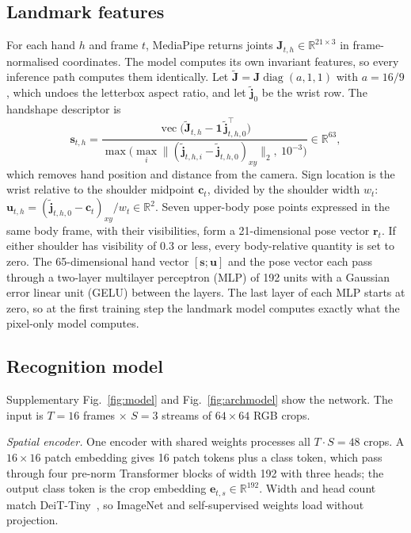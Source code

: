 \documentclass[pdflatex,sn-mathphys-num,twocolumn,lineno]{sn-jnl}
\theoremstyle{thmstyleone}%
\begin{document}
\subsection{Landmark features}\label{sec:method:lm}
For each hand $h$ and frame $t$, MediaPipe returns joints $\mathbf{J}_{t,h}\in\mathbb{R}^{21\times3}$ in frame-normalised coordinates. The model computes its own invariant features, so every inference path computes them identically. Let $\tilde{\mathbf{J}}=\mathbf{J}\operatorname{diag}(a,1,1)$ with $a=16/9$, which undoes the letterbox aspect ratio, and let $\tilde{\mathbf{j}}_{0}$ be the wrist row. The handshape descriptor is
\begin{equation}
\mathbf{s}_{t,h}=\frac{\operatorname{vec}\big(\tilde{\mathbf{J}}_{t,h}-\mathbf{1}\,\tilde{\mathbf{j}}^{\top}_{t,h,0}\big)}{\max\!\big(\max_i\lVert(\tilde{\mathbf{j}}_{t,h,i}-\tilde{\mathbf{j}}_{t,h,0})_{xy}\rVert_2,\ 10^{-3}\big)}\in\mathbb{R}^{63},\label{eq:shape}
\end{equation}
which removes hand position and distance from the camera. Sign location is the wrist relative to the shoulder midpoint $\mathbf{c}_t$, divided by the shoulder width $w_t$: $\mathbf{u}_{t,h}=(\tilde{\mathbf{j}}_{t,h,0}-\mathbf{c}_t)_{xy}/w_t\in\mathbb{R}^2$. Seven upper-body pose points expressed in the same body frame, with their visibilities, form a 21-dimensional pose vector $\mathbf{r}_t$. If either shoulder has visibility of 0.3 or less, every body-relative quantity is set to zero. The 65-dimensional hand vector $[\mathbf{s};\mathbf{u}]$ and the pose vector each pass through a two-layer multilayer perceptron (MLP) of 192 units with a Gaussian error linear unit (GELU) between the layers. The last layer of each MLP starts at zero, so at the first training step the landmark model computes exactly what the pixel-only model computes.

\subsection{Recognition model}\label{sec:method:model}
Supplementary Fig.~\ref{fig:model} and Fig.~\ref{fig:archmodel} show the network. The input is $T=16$ frames $\times$ $S=3$ streams of $64\times64$ RGB crops.

\textit{Spatial encoder.} One encoder with shared weights processes all $T\cdot S=48$ crops. A $16\times16$ patch embedding gives 16 patch tokens plus a class token, which pass through four pre-norm Transformer blocks of width 192 with three heads; the output class token is the crop embedding $\mathbf{e}_{t,s}\in\mathbb{R}^{192}$. Width and head count match DeiT-Tiny~\cite{touvron2021deit}, so ImageNet and self-supervised weights load without projection.
\end{document}
